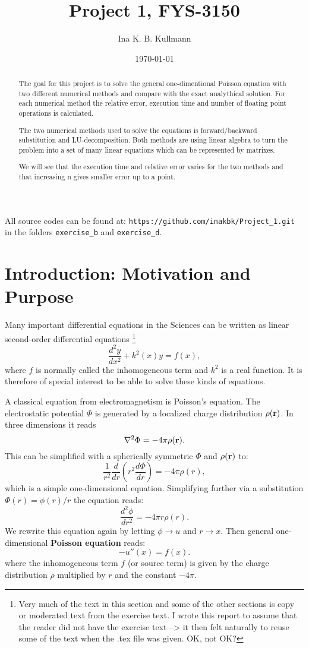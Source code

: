 \documentclass[11pt,a4wide]{article}
\title{Project 1, FYS-3150}
\author{Ina K. B. Kullmann}
\date{\today}
\begin{document}
\maketitle

\tableofcontents

{\scriptsize \noindent All source codes can be found at: \texttt{https://github.com/inakbk/Project\_1.git} in the folders \texttt{exercise\_b} and \texttt{exercise\_d}. }


\begin{abstract}
The goal for this project is to solve the general one-dimentional Poisson equation with two different numerical methods and compare with the exact analythical solution. For each numerical method the relative error, execution time and number of floating point operations is calculated.

The two numerical methods used to solve the equations is forward/backward substitution and LU-decomposition. Both methods are using linear algebra to turn the problem into a set of many linear equations which can be represented by matrixes. 

We will see that the execution time and relative error varies for the two methods and that increasing n gives smaller error up to a point. 
\end{abstract}


\newpage
\section{Introduction: Motivation and Purpose}

Many important differential equations in the Sciences can be written as linear second-order differential equations \footnote{Very much of the text in this section and some of the other sections is copy or moderated text from the exercise text. I wrote this report to assume that the reader did not have the exercise text --> it then felt naturally to reuse some of the text when the .tex file was given. OK, not OK?}
\[
\frac{d^2y}{dx^2}+k^2(x)y = f(x),
\]
where $f$ is normally called the inhomogeneous term and $k^2$ is a real function. It is therefore of special interest to be able to solve these kinds of equations. 

A classical equation from electromagnetism is Poisson's equation. The electrostatic potential $\Phi$ is generated by a localized charge distribution $\rho ({\bf r})$.   In three dimensions it reads
\[
\nabla^2 \Phi = -4\pi \rho ({\bf r}).
\]
This can be simplified with a spherically symmetric $\Phi$ and $\rho ({\bf r})$ to:
\[
\frac{1}{r^2}\frac{d}{dr}\left(r^2\frac{d\Phi}{dr}\right) = -4\pi \rho(r),
\]
which is a simple one-dimensional equation. Simplifying further via a substitution $\Phi(r)= \phi(r)/r$ the equation reads:
\[
\frac{d^2\phi}{dr^2}= -4\pi r\rho(r).
\]
We rewrite this equation again by letting $\phi\rightarrow u$ and 
$r\rightarrow x$. Then general one-dimensional \textbf{Poisson equation} reads:
\begin{equation}
-u''(x) = f(x). 
\label{eq:Poisson}
\end{equation}
where the inhomogeneous term $f$ (or source term) is given by the charge distribution $\rho$  multiplied by $r$ and the constant $-4\pi$.
\end{document}

